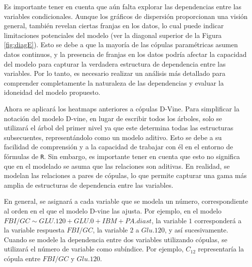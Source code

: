 Es importante tener en cuenta que aún falta explorar las dependencias entre las variables condicionales. Aunque los gráficos de dispersión proporcionan una visión general, también revelan ciertas franjas en los datos, lo cual puede indicar limitaciones potenciales del modelo (ver la diagonal superior de la Figura \ref{fig:diagE}). Esto se debe a que la mayoría de las cópulas paramétricas asumen datos continuos, y la presencia de franjas en los datos podría afectar la capacidad del modelo para capturar la verdadera estructura de dependencia entre las variables. Por lo tanto, es necesario realizar un análisis más detallado para comprender completamente la naturaleza de las dependencias y evaluar la idoneidad del modelo propuesto.

Ahora se aplicará los heatmaps anteriores a cópulas D-Vine. Para simplificar la notación del modelo D-vine, en lugar de escribir todos los árboles, solo se utilizará el árbol del primer nivel ya que este determina todas las estructuras subsecuentes, representándolo como un modelo aditivo. Esto se debe a su facilidad de comprensión y a la capacidad de trabajar con él en el entorno de fórmulas de \texttt{R}. Sin embargo, es importante tener en cuenta que esto no significa que en el modelado se asuma que las relaciones son aditivas. En realidad, se modelan las relaciones a pares de cópulas, lo que permite capturar una gama más amplia de estructuras de dependencia entre las variables.

En general, se asignará a cada variable que se modela un número, correspondiente al orden en el que el modelo D-vine las ajusta. Por ejemplo, en el modelo $FBI/GC \sim GLU.120 + GLU.0 + IBM + PA.diast$, la variable $1$ corresponderá a la variable respuesta $FBI/GC$, la variable $2$ a $Glu.120$, y así sucesivamente. Cuando se modele la dependencia entre dos variables utilizando cópulas, se utilizará el número de variable como subíndice. Por ejemplo, $C_{12}$ representaría la cópula entre $FBI/GC$ y $Glu.120$.


